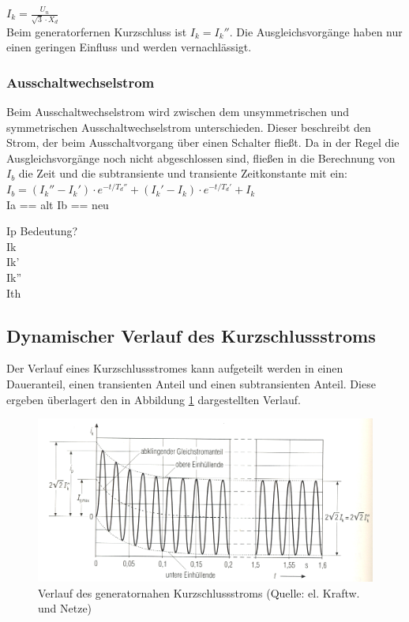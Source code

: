 \documentclass{scrartcl}
\begin{document}
\begin{onehalfspace}
$I_k = \frac{U_n}{\sqrt{3} \cdot X_d}$ \\

 Beim generatorfernen Kurzschluss ist $I_k = I_k''$. Die Ausgleichsvorgänge haben nur einen geringen Einfluss und werden vernachlässigt.

\subsubsection{Ausschaltwechselstrom}
Beim Ausschaltwechselstrom wird zwischen dem unsymmetrischen und symmetrischen Ausschaltwechselstrom unterschieden. Dieser beschreibt den Strom, der beim Ausschaltvorgang über einen Schalter fließt. Da in der Regel die Ausgleichsvorgänge noch nicht abgeschlossen sind, fließen in die Berechnung von $I_b$ die Zeit und die  subtransiente und transiente Zeitkonstante mit ein: \\

$I_b = (I_k'' - I_k') \cdot e ^{-t/T_d''} +  (I_k' - I_k) \cdot e ^{-t/T_d'} + I_k$ \\

Ia == alt Ib == neu

Ip Bedeutung?\\
Ik \\
Ik' \\
Ik'' \\
Ith \\

\subsection{Dynamischer Verlauf des Kurzschlussstroms}
Der Verlauf eines Kurzschlussstromes kann aufgeteilt werden in einen Daueranteil, einen transienten Anteil und einen subtransienten Anteil. Diese ergeben überlagert den in Abbildung \ref{kss-verlauf} dargestellten Verlauf.

	\begin{figure}[H]
	\centering
	\includegraphics[scale=1]{img/kurzschlussstromverlauf-nah.jpg}
	\caption{Verlauf des generatornahen Kurzschlussstroms (Quelle: el. Kraftw. und Netze)}
	\label{kss-verlauf}
	\end{figure}


\end{onehalfspace}
\end{document}
